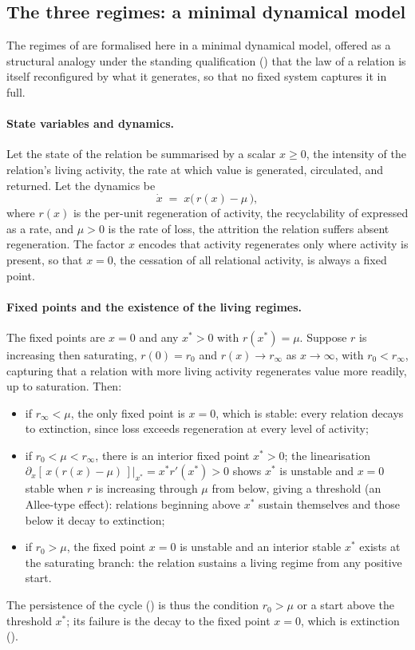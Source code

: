 \subsection{The three regimes: a minimal dynamical model}
\label{p11:sec:app-regimes}

The regimes of  are formalised here in a minimal dynamical model, offered as a structural analogy under the standing qualification () that the law of a relation is itself reconfigured by what it generates, so that no fixed system captures it in full.

\paragraph{State variables and dynamics.}
Let the state of the relation be summarised by a scalar $x \geq 0$, the intensity of the relation's living activity, the rate at which value is generated, circulated, and returned. Let the dynamics be
\[
\dot{x} \;=\; x\big(\,r(x) - \mu\,\big),
\]
where $r(x)$ is the per-unit regeneration of activity, the recyclability of  expressed as a rate, and $\mu > 0$ is the rate of loss, the attrition the relation suffers absent regeneration. The factor $x$ encodes that activity regenerates only where activity is present, so that $x = 0$, the cessation of all relational activity, is always a fixed point.

\paragraph{Fixed points and the existence of the living regimes.}
The fixed points are $x = 0$ and any $x^* > 0$ with $r(x^*) = \mu$. Suppose $r$ is increasing then saturating, $r(0) = r_0$ and $r(x) \to r_\infty$ as $x \to \infty$, with $r_0 < r_\infty$, capturing that a relation with more living activity regenerates value more readily, up to saturation. Then:
\begin{itemize}
\item if $r_\infty < \mu$, the only fixed point is $x = 0$, which is stable: every relation decays to extinction, since loss exceeds regeneration at every level of activity;
\item if $r_0 < \mu < r_\infty$, there is an interior fixed point $x^* > 0$; the linearisation $\partial_x[\,x(r(x)-\mu)\,]\big|_{x^*} = x^* r'(x^*) > 0$ shows $x^*$ is unstable and $x=0$ stable when $r$ is increasing through $\mu$ from below, giving a threshold (an Allee-type effect): relations beginning above $x^*$ sustain themselves and those below it decay to extinction;
\item if $r_0 > \mu$, the fixed point $x=0$ is unstable and an interior stable $x^*$ exists at the saturating branch: the relation sustains a living regime from any positive start.
\end{itemize}
The persistence of the cycle () is thus the condition $r_0 > \mu$ or a start above the threshold $x^*$; its failure is the decay to the fixed point $x=0$, which is extinction ().


